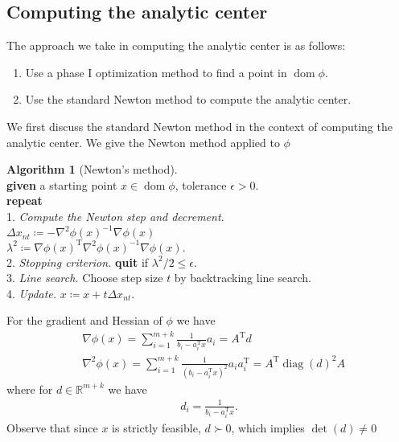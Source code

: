 \documentclass[11pt]{amsart}
\theoremstyle{definition}
\newtheorem{algorithm}{Algorithm}[section]
\theoremstyle{remark}
\newcommand{\ind}{\hspace*{0.5cm}}
\newcommand{\transpose}{\text{T}}
\DeclareMathOperator{\domain}{dom}
\DeclareMathOperator{\diag}{diag}
\begin{document}
    \subsection{Computing the analytic center}
        The approach we take in computing the analytic center is as follows:
        \begin{enumerate}
            \item Use a phase I optimization method to find a point in $\domain \phi$.
            \item Use the standard Newton method to compute the analytic center.
        \end{enumerate}
        We first discuss the standard Newton method in the context of computing the analytic center. We give the Newton method applied to $\phi$
        \begin{algorithm}[Newton's method]
        \label{a:basic_conceptual_cp_alg}\mbox{}\\
            \ind \textbf{given} a starting point $x \in \domain \phi$, tolerance $\epsilon > 0.$ \\
            \ind \textbf{repeat} \\
            \ind\ind 1. \emph{Compute the Newton step and decrement.} \\
            \ind\ind\ind $\Delta x_{nt} \coloneqq -\nabla^2 \phi(x)^{-1} \nabla \phi(x)$ \\
            \ind\ind\ind $\lambda^2 \coloneqq \nabla \phi(x)^\transpose \nabla^2 \phi(x)^{-1} \nabla \phi(x).$ \\
            \ind\ind 2. \emph{Stopping criterion.} \textbf{quit} if $\lambda^2/2 \leq \epsilon.$\\
            \ind\ind 3. \emph{Line search.} Choose step size $t$ by backtracking line search. \\
            \ind\ind 4. \emph{Update.} $x \coloneqq x + t\Delta x_{nt}.$ \\
        \end{algorithm} 
        For the gradient and Hessian of $\phi$ we have
        \begin{align}
            &\nabla \phi(x) = \sum_{i=1}^{m+k} \frac{1}{b_i - a_i^\transpose x}a_i = A^\transpose d \\
            &\nabla^2 \phi(x) = \sum_{i=1}^{m+k} \frac{1}{(b_i - a_i^\transpose x)^2}a_i a_i^\transpose = A^\transpose \diag(d)^2 A
        \end{align}
        where for $d \in \mathbb{R}^{m+k}$ we have
        \begin{align*}
            d_i = \frac{1}{b_i - a_i^\transpose x}.
        \end{align*}
        Observe that since $x$ is strictly feasible, $d \succ 0$, which implies $\det(d) \neq 0$ 
\end{document}

